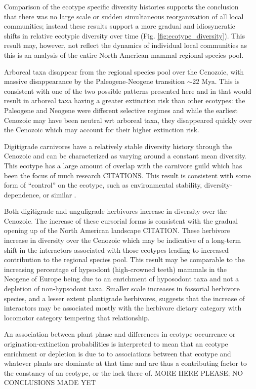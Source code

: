 \documentclass[12pt,letterpaper]{article}
\begin{document}
Comparison of the ecotype specific diversity histories supports the conclusion that there was no large scale or sudden simultaneous reorganization of all local communities; instead these results support a more gradual and idiosyncratic shifts in relative ecotypic diversity over time (Fig. \ref{fig:ecotype_diversity}). This result may, however, not reflect the dynamics of individual local communities as this is an analysis of the entire North American mammal regional species pool.

Arboreal taxa disappear from the regional species pool over the Cenozoic, with massive disappearance by the Paleogene-Neogene transition \(\sim\)22 Mya. This is consistent with one of the two possible patterns presented here and in \citet{Smits2015b} that would result in arboreal taxa having a greater extinction risk than other ecotypes: the Paleogene and Neogene were different selective regimes and while the earliest Cenozoic may have been neutral wrt arboreal taxa, they disappeared quickly over the Cenozoic which may account for their higher extinction risk.

Digitigrade carnivores have a relatively stable diversity history through the Cenozoic and can be characterized as varying around a constant mean diversity. This ecotype has a large amount of overlap with the carnivore guild which has been the focus of much research CITATIONS. This result is consistent with some form of ``control'' on the ecotype, such as environmental stability, diversity-dependence, or similar \citet{Slater2015c,Silvestro2015b}.

Both digitigrade and unguligrade herbivores increase in diversity over the Cenozoic. The increase of these cursorial forms is consistent with the gradual opening up of the North American landscape CITATION. These herbivore increase in diversity over the Cenozoic which may be indicative of a long-term shift in the interactors associated with those ecotypes leading to increased contribution to the regional species pool. This result may be comparable to the increasing percentage of hypsodont (high-crowned teeth) mammals in the Neogene of Europe being due to an enrichment of hyposodont taxa and not a depletion of non-hypsodont taxa. Smaller scale increases in fossorial herbivore species, and a lesser extent plantigrade herbivores, suggests that the increase of interactors may be associated mostly with the herbivore dietary category with locomotor category tempering that relationship.

An association between plant phase and differences in ecotype occurrence or origination-extinction probabilities is interpreted to mean that an  ecotype enrichment or depletion is due to to associations between that ecotype and whatever plants are dominate at that time and are thus a contributing factor to the constancy of an ecotype, or the lack there of. \uppercase{more here please; no conclusions made yet}
\end{document}
